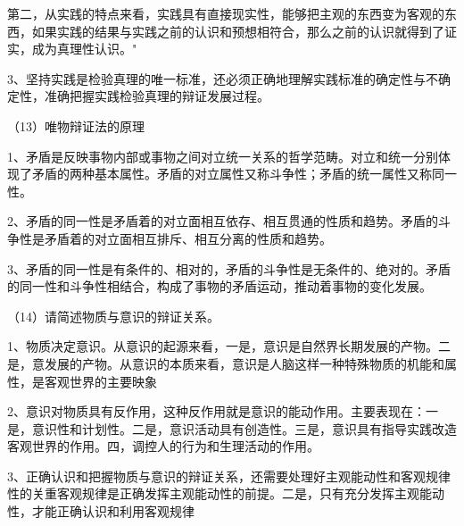 \documentclass[lang=cn,10pt]{elegantbook}
\begin{document}
	第二，从实践的特点来看，实践具有直接现实性，能够把主观的东西变为客观的东西，如果实践的结果与实践之前的认识和预想相符合，那么之前的认识就得到了证实，成为真理性认识。"
	
	3、坚持实践是检验真理的唯一标准，还必须正确地理解实践标准的确定性与不确定性，准确把握实践检验真理的辩证发展过程。
	
	
	（13）唯物辩证法的原理
	
	1、矛盾是反映事物内部或事物之间对立统一关系的哲学范畴。对立和统一分别体现了矛盾的两种基本属性。矛盾的对立属性又称斗争性；矛盾的统一属性又称同一性。
	
	2、矛盾的同一性是矛盾着的对立面相互依存、相互贯通的性质和趋势。矛盾的斗争性是矛盾着的对立面相互排斥、相互分离的性质和趋势。
	
	3、矛盾的同一性是有条件的、相对的，矛盾的斗争性是无条件的、绝对的。矛盾的同一性和斗争性相结合，构成了事物的矛盾运动，推动着事物的变化发展。
	
	（14）请简述物质与意识的辩证关系。
	
	1、物质决定意识。从意识的起源来看，一是，意识是自然界长期发展的产物。二是，意发展的产物。从意识的本质来看，意识是人脑这样一种特殊物质的机能和属性，是客观世界的主要映象
	
	2、意识对物质具有反作用，这种反作用就是意识的能动作用。主要表现在：一是，意识性和计划性。二是，意识活动具有创造性。三是，意识具有指导实践改造客观世界的作用。四，调控人的行为和生理活动的作用。
	
	3、正确认识和把握物质与意识的辩证关系，还需要处理好主观能动性和客观规律性的关重客观规律是正确发挥主观能动性的前提。二是，只有充分发挥主观能动性，才能正确认识和利用客观规律
	
\end{document}

